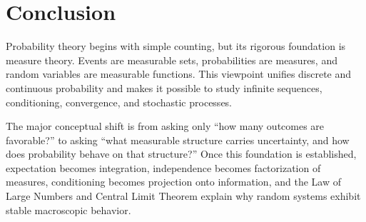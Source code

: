 \section{Conclusion}

Probability theory begins with simple counting, but its rigorous foundation is measure theory. Events are measurable sets, probabilities are measures, and random variables are measurable functions. This viewpoint unifies discrete and continuous probability and makes it possible to study infinite sequences, conditioning, convergence, and stochastic processes.

The major conceptual shift is from asking only ``how many outcomes are favorable?'' to asking ``what measurable structure carries uncertainty, and how does probability behave on that structure?'' Once this foundation is established, expectation becomes integration, independence becomes factorization of measures, conditioning becomes projection onto information, and the Law of Large Numbers and Central Limit Theorem explain why random systems exhibit stable macroscopic behavior.
